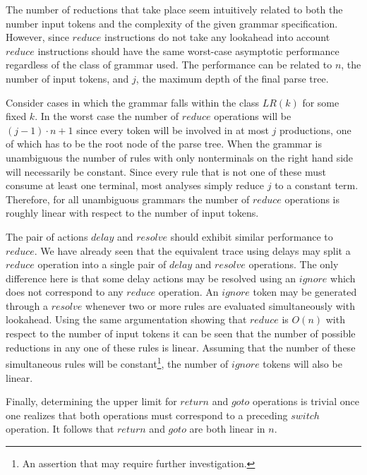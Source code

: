\documentclass[envcountsame,runningheads]{llncs}
\begin{document}
The number of reductions that take place seem intuitively related to both the number input tokens and the complexity of the given grammar specification.
However, since $reduce$ instructions do not take any lookahead into account $reduce$ instructions should have the same worst-case asymptotic performance regardless of the class of grammar used.
The performance can be related to $n$, the number of input tokens, and $j$, the maximum depth of the final parse tree.

Consider cases in which the grammar falls within the class $LR(k)$ for some fixed $k$.
In the worst case the number of $reduce$ operations will be $(j - 1) \cdot n + 1$ since every token will be involved in at most $j$ productions, one of which has to be the root node of the parse tree.
When the grammar is unambiguous the number of rules with only nonterminals on the right hand side will necessarily be constant.
Since every rule that is not one of these must consume at least one terminal, most analyses simply reduce $j$ to a constant term.
Therefore, for all unambiguous grammars the number of $reduce$ operations is roughly linear with respect to the number of input tokens.


The pair of actions $delay$ and $resolve$ should exhibit similar performance to $reduce$.
We have already seen that the equivalent trace using delays may split a $reduce$ operation into a single pair of $delay$ and $resolve$ operations.
The only difference here is that some delay actions may be resolved using an $ignore$ which does not correspond to any $reduce$ operation.
An $ignore$ token may be generated through a $resolve$ whenever two or more rules are evaluated simultaneously with lookahead. 
Using the same argumentation showing that $reduce$ is $O(n)$ with respect to the number of input tokens it can be seen that the number of possible reductions in any one of these rules is linear.
Assuming that the number of these simultaneous rules will be constant\footnote{An assertion that may require further investigation.}, the number of $ignore$ tokens will also be linear.

Finally, determining the upper limit for $return$ and $goto$ operations is trivial once one realizes that both operations must correspond to a preceding $switch$ operation. 
It follows that $return$ and $goto$ are both linear in $n$.\\
\end{document}
